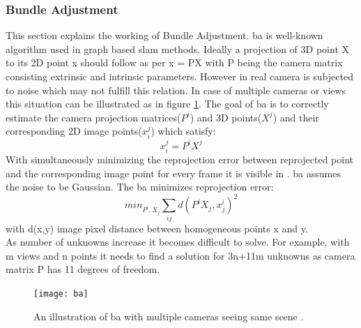 \subsubsection{Bundle Adjustment}
This section explains the working of Bundle Adjustment. \acrshort{ba} is well-known algorithm used in graph based \acrshort{slam} methods. Ideally a projection of 3D point X to its 2D point x should follow as per x = PX with P being the camera matrix consisting extrinsic and intrinsic parameters. However in real camera is subjected to noise which may not fulfill this relation. In case of multiple cameras or views this situation can be illustrated as in figure \ref{fig:ba}. The goal of \acrshort{ba} is to correctly estimate the camera projection matrices($ P^{i}$) and 3D points($X^{j}$) and their corresponding 2D image points($ x_{i}^{j} $) which satisfy:
\begin{equation*}
 x_{i}^{j} = P^{i}X^{j}
\end{equation*} 
With simultaneously minimizing the reprojection error between reprojected point and the corresponding image point for every frame it is visible in \cite{multiview_geometry}. \acrshort{ba} assumes the noise to be Gaussian. The \acrshort{ba} minimizes reprojection error:
\begin{equation*}
 min_{P^{i},X_{j}} \sum_{ij} d(P^{i}X_{j},x_{j}^{i})^{2}
\end{equation*} 
with d(x,y) image pixel distance between homogeneous points x and y. \\
\newline 
As number of unknowns increase it becomes difficult to solve. For example, with m views and n points it needs to find a solution for 3n+11m unknowns as camera matrix P has 11 degrees of freedom.

\begin{figure}[h]
	\centering
	\texttt{[image: ba]}
	\caption{An illustration of \acrshort{ba} with multiple cameras seeing same scene \cite{sfm}.}
	\label{fig:ba}
\end{figure}


